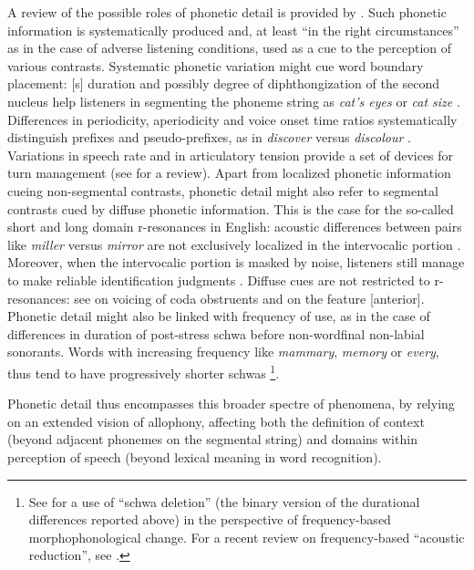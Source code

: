 A review of the possible roles of phonetic detail is provided by \citet[§5.1]{hawkins2003roles}. Such phonetic information is systematically produced and, at least ``in the right circumstances'' \citep{hawkins2010phonetic} as in the case of adverse listening conditions, used as a cue to the perception of various contrasts. Systematic phonetic variation might cue word boundary placement: [s] duration and possibly degree of diphthongization of the second nucleus help listeners in segmenting the phoneme string  as \textit{cat's eyes} or \textit{cat size} \citep{hawkins2001polysp}. Differences in periodicity, aperiodicity and voice onset time ratios systematically distinguish prefixes and pseudo-prefixes, as in \textit{discover} versus \textit{discolour} \citep{smith2012phonetic}. Variations in speech rate and in articulatory tension provide a set of devices for turn management (see \citealt{local2003phonetics} for a review). Apart from localized phonetic information cueing non-segmental contrasts, phonetic detail might also refer to segmental contrasts cued by diffuse phonetic information. This is the case for the so-called short and long domain r-resonances in English: acoustic differences between pairs like \textit{miller} versus \textit{mirror} are not exclusively localized in the intervocalic portion \citep{kelly1986long}. Moreover, when the intervocalic portion is masked by noise, listeners still manage to make reliable identification judgments \citep{west1999perception,heinrich2010influence}. Diffuse cues are not restricted to r-resonances: see \citet{hawkins2004influence} on voicing of coda obstruents and \citet{coleman2003discovering} on the feature [anterior]. Phonetic detail might also be linked with frequency of use, as in the case of differences in duration of post-stress schwa before non-wordfinal non-labial sonorants. Words with increasing frequency like \textit{mammary}, \textit{memory} or \textit{every}, thus tend to have progressively shorter schwas \citep{bybee2001phonology}\footnote{See \citet{hooper1976word} for a use of ``schwa deletion'' (the binary version of the durational differences reported above) in the perspective of frequency-based morphophonological change. For a recent review on frequency-based ``acoustic reduction'', see \citet{ernestusacoustic}.}.

Phonetic detail thus encompasses this broader spectre of phenomena, by relying on an extended vision of allophony, affecting both the definition of context (beyond adjacent phonemes on the segmental string) and domains within perception of speech (beyond lexical meaning in word recognition).

